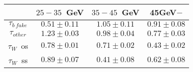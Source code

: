 \centering
\begin{tabular}{|c|c|c|c|} \hline
 & $25-35$~GeV & $35-45$~GeV & 45GeV$-$\\\hline
$\tau_{b~fake}$ & $0.51\pm0.11$ & $1.05\pm0.11$ & $0.91\pm0.08$\\\hline
$\tau_{other}$ & $1.23\pm0.03$ & $0.98\pm0.04$ & $0.77\pm0.03$\\\hline
$\tau_{W}$~os & $0.78\pm0.01$ & $0.71\pm0.02$ & $0.43\pm0.02$\\\hline
$\tau_{W}$~ss & $0.89\pm0.07$ & $0.41\pm0.08$ & $0.62\pm0.08$\\\hline
\end{tabular}
